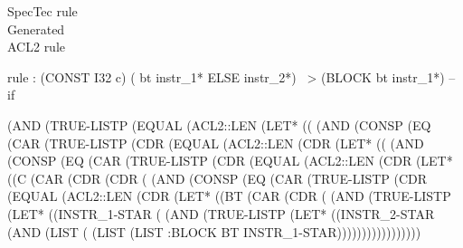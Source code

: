 \begin{slide}
  \noindent\begin{minipage}{.25\textwidth}
    \begin{center}\LARGE SpecTec rule\\[22mm]
      Generated\\ACL2 rule\end{center}
  \end{minipage}\hfill
  \begin{minipage}{.73\textwidth}
\begin{code}{\codesmall\baselineskip8pt}
rule :
  (CONST I32 c) ( bt instr_1* ELSE instr_2*)  ~>  (BLOCK bt instr_1*)
  -- if 
\end{code}
    \vspace*{2mm}
\begin{code}{\codetiny\baselineskip5.2pt}
(AND (TRUE-LISTP %
     (EQUAL (ACL2::LEN %
     (LET* ((%
       (AND (CONSP %
            (EQ (CAR %
            (TRUE-LISTP (CDR %
            (EQUAL (ACL2::LEN (CDR %
            (LET* ((%
              (AND (CONSP %
                   (EQ (CAR %
                   (TRUE-LISTP (CDR %
                   (EQUAL (ACL2::LEN (CDR %
                   (LET* ((C (CAR (CDR (CDR %
                          (%
                     (AND (CONSP %
                          (EQ (CAR %
                          (TRUE-LISTP (CDR %
                          (EQUAL (ACL2::LEN (CDR %
                          (LET* ((BT (CAR (CDR %
                                 (%
                            (AND (TRUE-LISTP %
                                 (LET* ((INSTR_1-STAR %
                                        (%
                                   (AND (TRUE-LISTP %
                                        (LET* ((INSTR_2-STAR %
                                          (AND 
                                               (LIST (%
                                                            (LIST (LIST :BLOCK
                                                                        BT
                                                                        INSTR_1-STAR)))))))))))))))))
\end{code}
  \end{minipage}\par
\end{slide}


